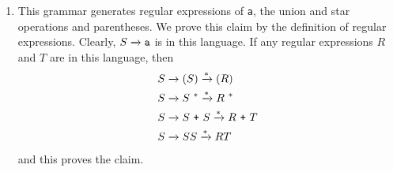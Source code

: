 \begin{solution}
\begin{enumerate}[label=\alph*)]
        \item This grammar generates regular expressions of \texttt{a}, the 
        union and star operations and parentheses. We prove this claim by the 
        definition of regular expressions. Clearly, $S \xrightarrow{} \texttt{a}$ is in 
        this language. If any regular expressions $R$ and $T$ are in this 
        language, then
        \begin{align*}
            S &\xrightarrow{} \left( S \right) \xrightarrow{*} \left( R \right) \\
            S &\xrightarrow{} S^{\ *} \xrightarrow{*} R^{\ *} \\
            S &\xrightarrow{} S\ \texttt{+}\ S \xrightarrow{*} R\ \texttt{+}\ T \\
            S &\xrightarrow{} SS \xrightarrow{*} RT
        \end{align*}
        and this proves the claim.
    \end{enumerate}
\end{solution}
